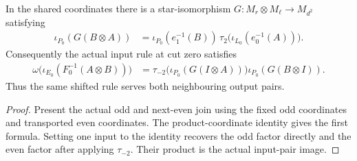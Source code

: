 \begin{lemma}
    \label{lem:qca_margolus_coherent_output_rule}
    \leanok
    In the shared coordinates there is a star-isomorphism
    $G:M_r\otimes M_\ell\to M_{d^2}$ satisfying
    \begin{align}
        \iota_{P_0}(G(B\otimes A))
         & =\iota_{P_0}(e_1^{-1}(B))\,
        \tau_2\bigl(\iota_{L_0}(e_0^{-1}(A))\bigr).
    \end{align}
    Consequently the actual input rule at cut zero satisfies
    \begin{align}
        \omega\bigl(\iota_{E_0}(F_0^{-1}(A\otimes B))\bigr)
         & =\tau_{-2}\bigl(\iota_{P_0}(G(I\otimes A))\bigr)
        \iota_{P_0}(G(B\otimes I)).
    \end{align}
    Thus the same shifted rule serves both neighbouring output pairs.
\end{lemma}
\begin{proof}
    \leanok
    Present the actual odd and next-even join using the fixed odd
    coordinates and transported even coordinates. The product-coordinate
    identity gives the first formula. Setting one input to the identity
    recovers the odd factor directly and the even factor after applying
    $\tau_{-2}$. Their product is the actual input-pair image.
\end{proof}

